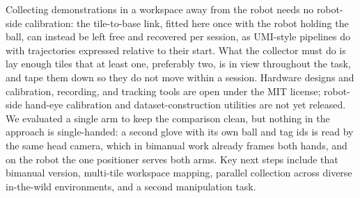 Collecting demonstrations in a workspace away from the robot needs no robot-side calibration: the tile-to-base link, fitted here once with the robot holding the ball, can instead be left free and recovered per session, as UMI-style pipelines do with trajectories expressed relative to their start. What the collector must do is lay enough tiles that at least one, preferably two, is in view throughout the task, and tape them down so they do not move within a session.
Hardware designs \citep{yamumi2026} and calibration, recording, and tracking tools \citep{forwardcamumi2026} are open under the MIT license; robot-side hand-eye calibration and dataset-construction utilities are not yet released.
We evaluated a single arm to keep the comparison clean, but nothing in the approach is single-handed: a second glove with its own ball and tag ids is read by the same head camera, which in bimanual work already frames both hands, and on the robot the one positioner serves both arms. Key next steps include that bimanual version, multi-tile workspace mapping, parallel collection across diverse in-the-wild environments, and a second manipulation task.
